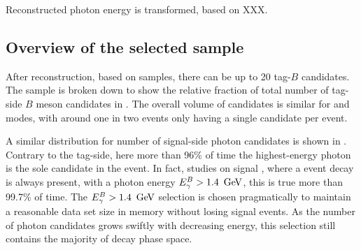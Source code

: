 Reconstructed photon energy is transformed, based on XXX.

\subsection{Overview of the selected sample}\label{sec:reconstruction_overview}

After reconstruction, based on \MC samples, there can be up to 20 tag-$B$ candidates.
The sample is broken down to show the relative fraction of total number of tag-side $B$ meson candidates in .
The overall volume of candidates is similar for \feiBp and \feiBz modes, with around one in two events only having a single candidate per event.

A similar distribution for number of signal-side photon candidates is shown in .
Contrary to the tag-side, here more than 96\% of time the highest-energy photon is the sole candidate in the event.
In fact, studies on signal \MC, where a \BtoXsgamma event decay is always present, with a photon energy ${E^B_{\gamma}}>1.4~\mathrm{\,Ge\kern -0.1em V}$, this is true more than  99.7\% of time.
The ${E^B_{\gamma}}>1.4~\mathrm{\,Ge\kern -0.1em V}$ selection is chosen pragmatically to maintain a reasonable data set size in memory without losing signal events.
As the number of photon candidates grows swiftly with decreasing energy, this selection still contains the majority of \BtoXsgamma decay phase space.

